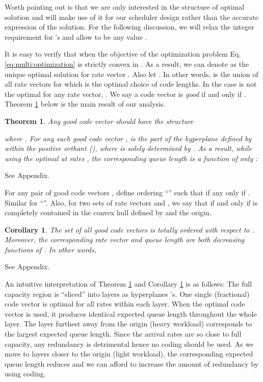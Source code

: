 \documentclass[journal]{IEEEtran}
\newtheorem{theorem}{\textbf{Theorem}}
\newtheorem{corollary}{\textbf{Corollary}}
\begin{document}
Worth pointing out is that we are only interested in the structure of optimal solution and will make use of it for our scheduler design rather than the accurate expression of the solution.
For the following discussion, we will relax the integer requirement for 's and allow  to be any value . 

It is easy to verify that when  the objective of the optimization problem Eq.\ref{eq:multi:optimization} is strictly convex in .
As a result, we can denote  as the unique optimal solution for rate vector . Also let . In other words,  is the union of all rate vectors for which  is the optimal choice of code lengths. In the case  is not the optimal for any rate vector, . We say a code vector  is {\em good} if and only if . Theorem \ref{thm:optimal} below is the main result of our analysis.


\begin{theorem}
\label{thm:optimal}
Any good code vector   should have the structure

where .
For any such good code vector ,  is the part of the hyperplane defined by   within the positive orthant (), where  is solely determined by . As a result, while using the optimal   at rates , the corresponding queue length is a function of only :

\end{theorem}



\begin{IEEEproof} See Appendix.
\end{IEEEproof}


For any pair of good code vectors , define ordering ``'' such that  if any only if . Similar for ``''. 
Also, for two sets of rate vectors  and , we say that  if and only if  is completely contained in the convex hull defined by  and the origin.



\begin{corollary}
\label{thm:ordered}
The set of all good code vectors is totally ordered with respect to .  Moreover, 
 the corresponding rate vector  and queue length  are both decreasing functions of . In other words, 

\end{corollary}

\begin{IEEEproof}
See Appendix.
\end{IEEEproof}

An intuitive interpretation of Theorem \ref{thm:optimal} and Corollary \ref{thm:ordered} is as follows: The full capacity region  is ``sliced'' into layers as hyperplanes 's. One single (fractional) code vector is optimal for all rates within each layer. When the optimal code vector is used, it produces identical expected queue length throughout the whole layer.  
The layer furthest away from the origin (heavy workload) corresponds to the largest expected queue length. Since the arrival rates are so close to full capacity, any redundancy is detrimental hence no coding should be used. As we move to layers closer to the origin (light workload), the corresponding expected queue length reduces and we can afford to increase the amount of redundancy by using coding.
\end{document}
